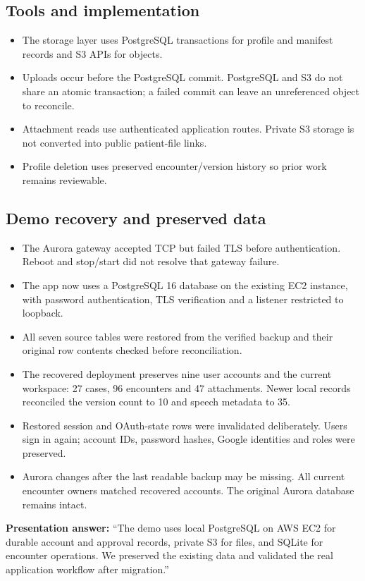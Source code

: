 \documentclass[10pt,letterpaper]{article}
\newcommand{\callout}[1]{\par\vspace{5pt}\noindent\colorbox{pale}{\parbox{\dimexpr\linewidth-2\fboxsep\relax}{\small #1}}\par\vspace{5pt}}
\begin{document}
\subsection*{Tools and implementation}
\begin{itemize}
\item The storage layer uses PostgreSQL transactions for profile and manifest records and S3 APIs for objects.
\item Uploads occur before the PostgreSQL commit. PostgreSQL and S3 do not share an atomic transaction; a failed commit can leave an unreferenced object to reconcile.
\item Attachment reads use authenticated application routes. Private S3 storage is not converted into public patient-file links.
\item Profile deletion uses preserved encounter/version history so prior work remains reviewable.
\end{itemize}
\subsection*{Demo recovery and preserved data}
\begin{itemize}
\item The Aurora gateway accepted TCP but failed TLS before authentication. Reboot and stop/start did not resolve that gateway failure.
\item The app now uses a PostgreSQL 16 database on the existing EC2 instance, with password authentication, TLS verification and a listener restricted to loopback.
\item All seven source tables were restored from the verified backup and their original row contents checked before reconciliation.
\item The recovered deployment preserves nine user accounts and the current workspace: 27 cases, 96 encounters and 47 attachments. Newer local records reconciled the version count to 10 and speech metadata to 35.
\item Restored session and OAuth-state rows were invalidated deliberately. Users sign in again; account IDs, password hashes, Google identities and roles were preserved.
\item Aurora changes after the last readable backup may be missing. All current encounter owners matched recovered accounts. The original Aurora database remains intact.
\end{itemize}
\callout{\textbf{Presentation answer:} ``The demo uses local PostgreSQL on AWS EC2 for durable account and approval records, private S3 for files, and SQLite for encounter operations. We preserved the existing data and validated the real application workflow after migration.''}
\end{document}
